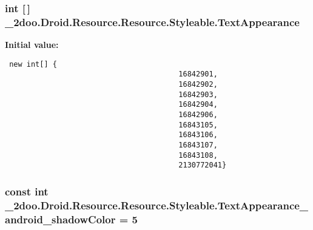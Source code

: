 \hypertarget{class__2doo_1_1_droid_1_1_resource_1_1_styleable_e6781b389d581d21847d7c409602c8d8}{
\subsubsection[{TextAppearance}]{\setlength{\rightskip}{0pt plus 5cm}int \mbox{[}$\,$\mbox{]} \_\-2doo.Droid.Resource.Resource.Styleable.TextAppearance}}
\label{class__2doo_1_1_droid_1_1_resource_1_1_styleable_e6781b389d581d21847d7c409602c8d8}


\textbf{Initial value:}

\begin{Code}\begin{verbatim} new int[] {
                                        16842901,
                                        16842902,
                                        16842903,
                                        16842904,
                                        16842906,
                                        16843105,
                                        16843106,
                                        16843107,
                                        16843108,
                                        2130772041}
\end{verbatim}
\end{Code}
\hypertarget{class__2doo_1_1_droid_1_1_resource_1_1_styleable_b990461e43cbd95e7763f08dcde2fc2e}{
\subsubsection[{TextAppearance\_\-android\_\-shadowColor}]{\setlength{\rightskip}{0pt plus 5cm}const int \_\-2doo.Droid.Resource.Resource.Styleable.TextAppearance\_\-android\_\-shadowColor = 5}}
\label{class__2doo_1_1_droid_1_1_resource_1_1_styleable_b990461e43cbd95e7763f08dcde2fc2e}


